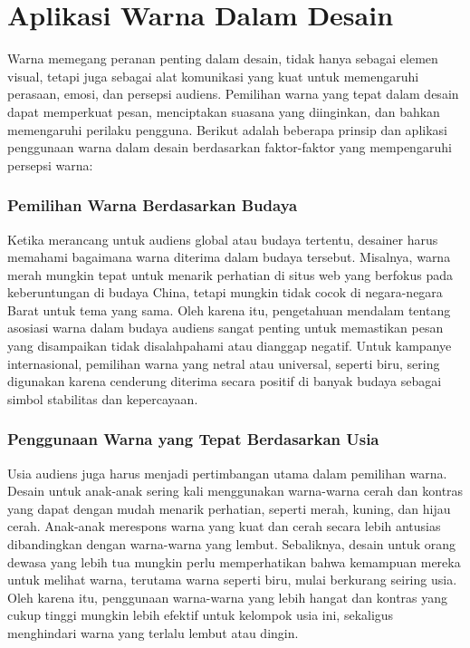 \documentclass[a4paper]{article}
\begin{document}
\section{Aplikasi Warna Dalam Desain}
Warna memegang peranan penting dalam desain, tidak hanya sebagai elemen visual, tetapi juga sebagai alat komunikasi yang kuat untuk memengaruhi perasaan, emosi, dan persepsi audiens. Pemilihan warna yang tepat dalam desain dapat memperkuat pesan, menciptakan suasana yang diinginkan, dan bahkan memengaruhi perilaku pengguna. Berikut adalah beberapa prinsip dan aplikasi penggunaan warna dalam desain berdasarkan faktor-faktor yang mempengaruhi persepsi warna:

\subsubsection{Pemilihan Warna Berdasarkan Budaya}
Ketika merancang untuk audiens global atau budaya tertentu, desainer harus memahami bagaimana warna diterima dalam budaya tersebut. Misalnya, warna merah mungkin tepat untuk menarik perhatian di situs web yang berfokus pada keberuntungan di budaya China, tetapi mungkin tidak cocok di negara-negara Barat untuk tema yang sama. Oleh karena itu, pengetahuan mendalam tentang asosiasi warna dalam budaya audiens sangat penting untuk memastikan pesan yang disampaikan tidak disalahpahami atau dianggap negatif. Untuk kampanye internasional, pemilihan warna yang netral atau universal, seperti biru, sering digunakan karena cenderung diterima secara positif di banyak budaya sebagai simbol stabilitas dan kepercayaan.

\subsubsection{Penggunaan Warna yang Tepat Berdasarkan Usia}
Usia audiens juga harus menjadi pertimbangan utama dalam pemilihan warna. Desain untuk anak-anak sering kali menggunakan warna-warna cerah dan kontras yang dapat dengan mudah menarik perhatian, seperti merah, kuning, dan hijau cerah. Anak-anak merespons warna yang kuat dan cerah secara lebih antusias dibandingkan dengan warna-warna yang lembut. Sebaliknya, desain untuk orang dewasa yang lebih tua mungkin perlu memperhatikan bahwa kemampuan mereka untuk melihat warna, terutama warna seperti biru, mulai berkurang seiring usia. Oleh karena itu, penggunaan warna-warna yang lebih hangat dan kontras yang cukup tinggi mungkin lebih efektif untuk kelompok usia ini, sekaligus menghindari warna yang terlalu lembut atau dingin.
\end{document}
